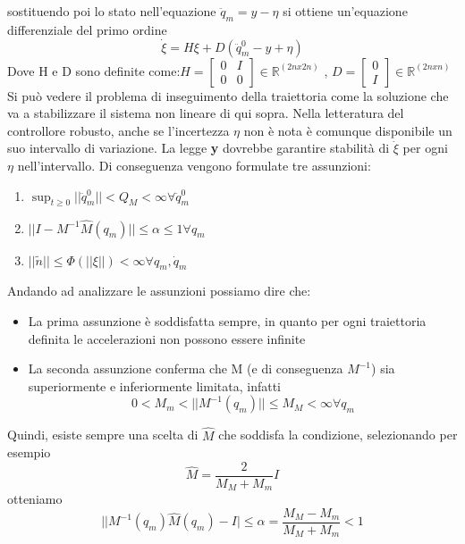 sostituendo poi lo stato nell'equazione $\ddot{q}_m = y-\eta$ si ottiene un'equazione differenziale del primo ordine
\begin{equation}
\dot{\xi} = H\xi + D(\ddot{q}_m^0 - y + \eta)
\end{equation}
Dove H e D sono definite come:$H = \begin{bmatrix}
0 & I \\ 0 & 0
\end{bmatrix} \in \mathbb{R}^{(2nx2n)}$ , $D = \begin{bmatrix}
0 \\ I
\end{bmatrix} \in \mathbb{R}^{(2nxn)}$
\\Si può vedere il problema di inseguimento della traiettoria come la soluzione che va a stabilizzare il sistema non lineare di qui sopra. Nella letteratura del controllore robusto, anche se l'incertezza $\eta$ non è nota è comunque disponibile un suo intervallo di variazione. La legge \textbf{y} dovrebbe garantire stabilità di $\dot{\xi}$ per ogni $\eta$ nell'intervallo. Di conseguenza vengono formulate tre assunzioni:
\begin{enumerate}
\item $\sup_{t\ge 0} ||\ddot{q}^0_m || < Q_M < \infty \forall \ddot{q}_m^0$
\item $||I-M^{-1}\hat{M}(q_m)|| \le \alpha \le 1 \forall q_m$
\item $||\tilde{n}|| \le \Phi(||\xi||) < \infty \forall q_m, \dot{q}_m$
\end{enumerate}
Andando ad analizzare le assunzioni possiamo dire che:
\begin{itemize}
\item La prima assunzione è soddisfatta sempre, in quanto per ogni traiettoria definita le accelerazioni non possono essere infinite
\item La seconda assunzione conferma che M  (e di conseguenza $M^{-1}$) sia superiormente e inferiormente limitata, infatti 
\begin{equation}
0 < M_m < ||M^{-1}(q_m)|| \le M_M < \infty \forall q_m
\end{equation}
\end{itemize}
Quindi, esiste sempre una scelta di $\hat{M}$ che soddisfa la condizione, selezionando per esempio
\begin{equation*}
\hat{M} = \frac{2}{M_M+M_m}I
\end{equation*} 
otteniamo
\begin{equation}
||M^{-1}(q_m)\hat{M}(q_m)-I|\le \alpha = \frac{M_M-M_m}{M_M+M_m} <1
\end{equation}

